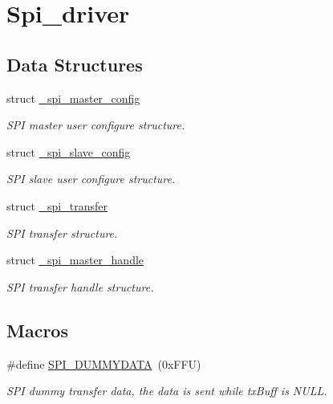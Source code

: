 \hypertarget{group__spi__driver}{}\section{Spi\+\_\+driver}
\label{group__spi__driver}
\subsection*{Data Structures}
\begin{DoxyCompactItemize}
\item 
struct \mbox{\hyperlink{struct__spi__master__config}{\+\_\+spi\+\_\+master\+\_\+config}}
\begin{DoxyCompactList}\small\item\em S\+PI master user configure structure. \end{DoxyCompactList}\item 
struct \mbox{\hyperlink{struct__spi__slave__config}{\+\_\+spi\+\_\+slave\+\_\+config}}
\begin{DoxyCompactList}\small\item\em S\+PI slave user configure structure. \end{DoxyCompactList}\item 
struct \mbox{\hyperlink{struct__spi__transfer}{\+\_\+spi\+\_\+transfer}}
\begin{DoxyCompactList}\small\item\em S\+PI transfer structure. \end{DoxyCompactList}\item 
struct \mbox{\hyperlink{struct__spi__master__handle}{\+\_\+spi\+\_\+master\+\_\+handle}}
\begin{DoxyCompactList}\small\item\em S\+PI transfer handle structure. \end{DoxyCompactList}\end{DoxyCompactItemize}
\subsection*{Macros}
\begin{DoxyCompactItemize}
\item 
\mbox{\label{group__spi__driver_ga1541129ba8262e1649592b5109e2074c}} 
\#define \mbox{\hyperlink{group__spi__driver_ga1541129ba8262e1649592b5109e2074c}{S\+P\+I\+\_\+\+D\+U\+M\+M\+Y\+D\+A\+TA}}~(0x\+F\+F\+U)
\begin{DoxyCompactList}\small\item\em S\+PI dummy transfer data, the data is sent while tx\+Buff is N\+U\+LL. \end{DoxyCompactList}\end{DoxyCompactItemize}
